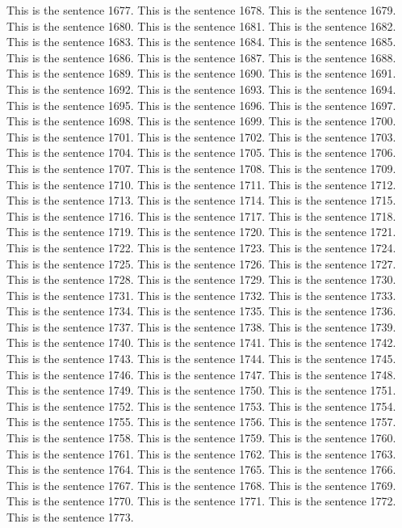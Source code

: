 \documentclass{article}
\begin{document}
This is the sentence 1677.
This is the sentence 1678.
This is the sentence 1679.
This is the sentence 1680.
This is the sentence 1681.
This is the sentence 1682.
This is the sentence 1683.
This is the sentence 1684.
This is the sentence 1685.
This is the sentence 1686.
This is the sentence 1687.
This is the sentence 1688.
This is the sentence 1689.
This is the sentence 1690.
This is the sentence 1691.
This is the sentence 1692.
This is the sentence 1693.
This is the sentence 1694.
This is the sentence 1695.
This is the sentence 1696.
This is the sentence 1697.
This is the sentence 1698.
This is the sentence 1699.
This is the sentence 1700.
This is the sentence 1701.
This is the sentence 1702.
This is the sentence 1703.
This is the sentence 1704.
This is the sentence 1705.
This is the sentence 1706.
This is the sentence 1707.
This is the sentence 1708.
This is the sentence 1709.
This is the sentence 1710.
This is the sentence 1711.
This is the sentence 1712.
This is the sentence 1713.
This is the sentence 1714.
This is the sentence 1715.
This is the sentence 1716.
This is the sentence 1717.
This is the sentence 1718.
This is the sentence 1719.
This is the sentence 1720.
This is the sentence 1721.
This is the sentence 1722.
This is the sentence 1723.
This is the sentence 1724.
This is the sentence 1725.
This is the sentence 1726.
This is the sentence 1727.
This is the sentence 1728.
This is the sentence 1729.
This is the sentence 1730.
This is the sentence 1731.
This is the sentence 1732.
This is the sentence 1733.
This is the sentence 1734.
This is the sentence 1735.
This is the sentence 1736.
This is the sentence 1737.
This is the sentence 1738.
This is the sentence 1739.
This is the sentence 1740.
This is the sentence 1741.
This is the sentence 1742.
This is the sentence 1743.
This is the sentence 1744.
This is the sentence 1745.
This is the sentence 1746.
This is the sentence 1747.
This is the sentence 1748.
This is the sentence 1749.
This is the sentence 1750.
This is the sentence 1751.
This is the sentence 1752.
This is the sentence 1753.
This is the sentence 1754.
This is the sentence 1755.
This is the sentence 1756.
This is the sentence 1757.
This is the sentence 1758.
This is the sentence 1759.
This is the sentence 1760.
This is the sentence 1761.
This is the sentence 1762.
This is the sentence 1763.
This is the sentence 1764.
This is the sentence 1765.
This is the sentence 1766.
This is the sentence 1767.
This is the sentence 1768.
This is the sentence 1769.
This is the sentence 1770.
This is the sentence 1771.
This is the sentence 1772.
This is the sentence 1773.
\end{document}

